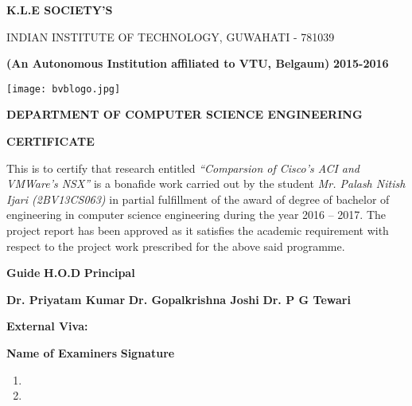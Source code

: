 \documentclass[Major_Report]{subfiles}
\begin{document}
\begin{center}

{\color{auburn} \textbf{K.L.E SOCIETY'S}} \linebreak

\begin{small}
INDIAN INSTITUTE OF TECHNOLOGY, GUWAHATI - 781039 \linebreak
\end{small}

{\color{violet} \textbf{(An Autonomous Institution affiliated to VTU, Belgaum)}}
{\color {brown} \textbf{2015-2016 \linebreak}}

\texttt{[image: bvblogo.jpg]}
\vspace{0.1cm}

\textbf{DEPARTMENT OF COMPUTER SCIENCE ENGINEERING} \linebreak

\begin{Large}
{\color{violet} \textbf{CERTIFICATE}} \linebreak
\end{Large}

\justify
This is to certify that research entitled \textit{“Comparsion of Cisco's ACI and VMWare's NSX”} is a bonafide work carried out by the student  \textit{Mr. Palash Nitish Ijari (2BV13CS063)} in partial fulfillment of the award of degree of bachelor of engineering in computer science engineering during the year 2016 – 2017. The project report has been approved as it satisfies the academic requirement with respect to the project work prescribed for the above said programme.
\linebreak

\vspace{0.3cm}
\textbf{Guide} \hspace{3cm} \textbf{H.O.D} \hspace{2.5cm} \textbf{Principal}

\begin{small} 
\begin{flushleft}
\textbf{Dr. Priyatam Kumar} \hspace{0.3cm} \textbf{Dr. Gopalkrishna Joshi} \hspace{0.3cm} \textbf{Dr. P G Tewari} 
\end{flushleft}
\end{small} 

\end{center}

\begin{flushleft}
\textbf{External Viva:}
\end{flushleft}

\begin{flushleft}
\textbf{Name of Examiners} \hspace{7cm}
\textbf{Signature}
\end{flushleft}

\begin{enumerate}
\item  
\item  
\end{enumerate}

\thispagestyle{empty}
\end{document}
